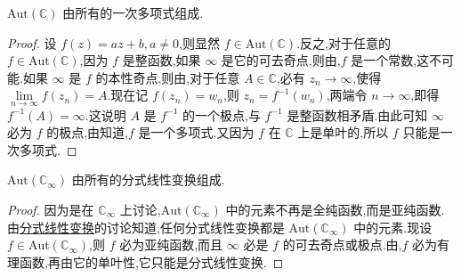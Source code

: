 \documentclass[../../main.tex]{subfiles}%
\begin{document}
\begin{theorem}\label{theorem:定理5.3.4}
\( \mathrm{Aut}(\mathbb{C}) \) 由所有的一次多项式组成.
\end{theorem}
\begin{proof}
设 \( f(z) = az + b, a \neq 0 \),则显然 \( f \in \mathrm{Aut}(\mathbb{C}) \).反之,对于任意的 \( f \in \mathrm{Aut}(\mathbb{C}) \),因为 \( f \) 是整函数,如果 \( \infty \) 是它的可去奇点,则由,\( f \) 是一个常数,这不可能.如果 \( \infty \) 是 \( f \) 的本性奇点,则由,对于任意 \( A \in \mathbb{C} \),必有 \( z_n \to \infty \),使得 \( \lim\limits_{n \to \infty} f(z_n) = A \).现在记 \( f(z_n) = w_n \),则 \( z_n = f^{-1}(w_n) \),两端令 \( n \to \infty \),即得 \( f^{-1}(A) = \infty \).这说明 \( A \) 是 \( f^{-1} \) 的一个极点,与 \( f^{-1} \) 是整函数相矛盾.由此可知 \( \infty \) 必为 \( f \) 的极点,由知道,\( f \) 是一个多项式.又因为 \( f \) 在 \( \mathbb{C} \) 上是单叶的,所以 \( f \) 只能是一次多项式.
\end{proof}

\begin{theorem}\label{theorem:定理5.3.5}
\( \mathrm{Aut}(\mathbb{C}_{\infty}) \) 由所有的分式线性变换组成.
\end{theorem}
\begin{proof}
因为是在 \( \mathbb{C}_{\infty} \) 上讨论,\( \mathrm{Aut}(\mathbb{C}_{\infty}) \) 中的元素不再是全纯函数,而是亚纯函数.由\hyperref[section:2.2.5]{分式线性变换}的讨论知道,任何分式线性变换都是 \( \mathrm{Aut}(\mathbb{C}_{\infty}) \) 中的元素.现设 \( f \in \mathrm{Aut}(\mathbb{C}_{\infty}) \),则 \( f \) 必为亚纯函数,而且 \( \infty \) 必是 \( f \) 的可去奇点或极点.由,\( f \) 必为有理函数,再由它的单叶性,它只能是分式线性变换.
\end{proof}
\end{document}
